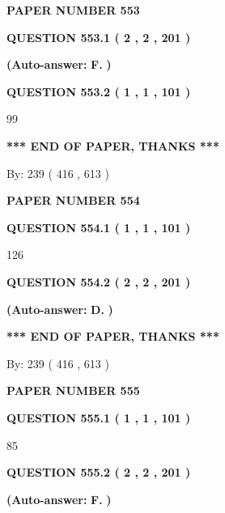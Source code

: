 \documentclass{ctexart}
\begin{document}
   
 {\textbf{ \Large{ PAPER NUMBER  553  }}}
   
   
   
   
  
  
{\textbf{\large{QUESTION
553.1 
 ( 2 , 2 , 201 )
}}}
 
 
{\textbf{(Auto-answer:}}
{\textbf{\large{
F.}}}
{\textbf{)}}
 
 
  
  
{\textbf{\large{QUESTION
553.2 
 ( 1 , 1 , 101 )
}}}

99
   
   
   
   
\vspace{1.0in} 
{\textbf{\large{ *** END OF PAPER, THANKS *** }}} 
   
   
\hspace{1.0in} By: 
 239 ( 416 ,  613 )
   
   
   
   
\newpage 
\setcounter{page}{ 
   554001 } 
   
   
 {\textbf{ \Large{ PAPER NUMBER  554  }}}
   
   
   
   
  
  
{\textbf{\large{QUESTION
554.1 
 ( 1 , 1 , 101 )
}}}

126
  
  
{\textbf{\large{QUESTION
554.2 
 ( 2 , 2 , 201 )
}}}
 
 
{\textbf{(Auto-answer:}}
{\textbf{\large{
D.}}}
{\textbf{)}}
 
 
   
   
   
   
\vspace{1.0in} 
{\textbf{\large{ *** END OF PAPER, THANKS *** }}} 
   
   
\hspace{1.0in} By: 
 239 ( 416 ,  613 )
   
   
   
   
\newpage 
\setcounter{page}{ 
   555001 } 
   
   
 {\textbf{ \Large{ PAPER NUMBER  555  }}}
   
   
   
   
  
  
{\textbf{\large{QUESTION
555.1 
 ( 1 , 1 , 101 )
}}}

85
  
  
{\textbf{\large{QUESTION
555.2 
 ( 2 , 2 , 201 )
}}}
 
 
{\textbf{(Auto-answer:}}
{\textbf{\large{
F.}}}
{\textbf{)}}
 
\end{document}
